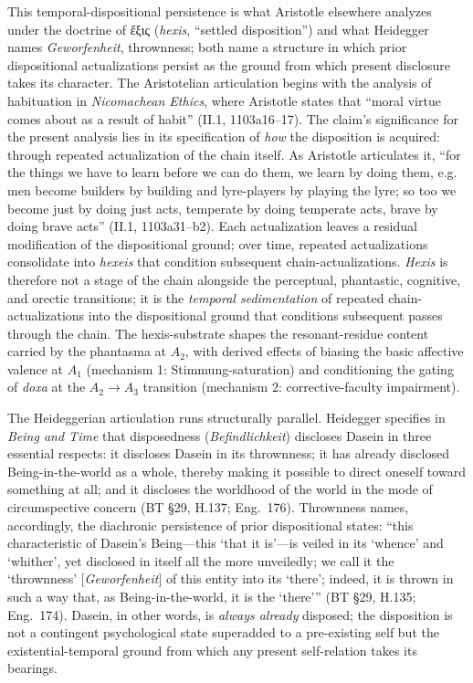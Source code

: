 \documentclass{article}
\begin{document}
This temporal-dispositional persistence is what Aristotle elsewhere analyzes under the doctrine of ἕξις (\textit{hexis}, ``settled disposition'') and what Heidegger names \textit{Geworfenheit}, thrownness; both name a structure in which prior dispositional actualizations persist as the ground from which present disclosure takes its character. The Aristotelian articulation begins with the analysis of habituation in \textit{Nicomachean Ethics}, where Aristotle states that ``moral virtue comes about as a result of habit'' (II.1, 1103a16--17). The claim's significance for the present analysis lies in its specification of \textit{how} the disposition is acquired: through repeated actualization of the chain itself. As Aristotle articulates it, ``for the things we have to learn before we can do them, we learn by doing them, e.g. men become builders by building and lyre-players by playing the lyre; so too we become just by doing just acts, temperate by doing temperate acts, brave by doing brave acts'' (II.1, 1103a31--b2). Each actualization leaves a residual modification of the dispositional ground; over time, repeated actualizations consolidate into \textit{hexeis} that condition subsequent chain-actualizations. \textit{Hexis} is therefore not a stage of the chain alongside the perceptual, phantastic, cognitive, and orectic transitions; it is the \textit{temporal sedimentation} of repeated chain-actualizations into the dispositional ground that conditions subsequent passes through the chain. The hexis-substrate shapes the resonant-residue content carried by the phantasma at $A_2$, with derived effects of biasing the basic affective valence at $A_1$ (mechanism 1: Stimmung-saturation) and conditioning the gating of \textit{doxa} at the $A_2 \rightarrow A_3$ transition (mechanism 2: corrective-faculty impairment).

The Heideggerian articulation runs structurally parallel. Heidegger specifies in \textit{Being and Time} that disposedness (\textit{Befindlichkeit}) discloses Dasein in three essential respects: it discloses Dasein in its thrownness; it has already disclosed Being-in-the-world as a whole, thereby making it possible to direct oneself toward something at all; and it discloses the worldhood of the world in the mode of circumspective concern (BT \S29, H.137; Eng.~176). Thrownness names, accordingly, the diachronic persistence of prior dispositional states: ``this characteristic of Dasein's Being---this `that it is'---is veiled in its `whence' and `whither', yet disclosed in itself all the more unveiledly; we call it the `thrownness' [\textit{Geworfenheit}] of this entity into its `there'; indeed, it is thrown in such a way that, as Being-in-the-world, it is the `there''' (BT \S29, H.135; Eng.~174). Dasein, in other words, is \textit{always already} disposed; the disposition is not a contingent psychological state superadded to a pre-existing self but the existential-temporal ground from which any present self-relation takes its bearings.
\end{document}
